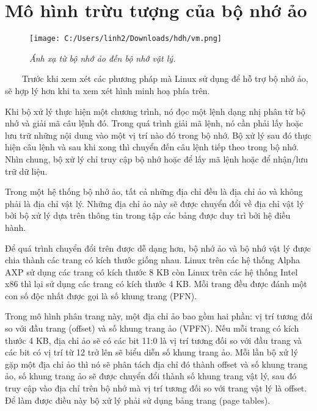 \documentclass{article}
\begin{document}
\section{Mô hình trừu tượng của bộ nhớ ảo}

\begin{figure}[H]
  \centering
  \texttt{[image: C:/Users/linh2/Downloads/hdh/vm.png]}
  \caption{\textit{Ánh xạ từ bộ nhớ ảo đến bộ nhớ vật lý.}}
  \label{fig:abstractmodel1}
\end{figure}
~~~~Trước khi xem xét các phương pháp mà Linux sử dụng để hỗ trợ bộ nhớ ảo, sẽ hợp lý hơn khi ta xem xét hình minh hoạ phía trên.\vspace{1em}

Khi bộ xử lý thực hiện một chương trình, nó đọc một lệnh dạng nhị phân từ bộ nhớ và giải mã câu lệnh đó. Trong quá trình giải mã lệnh, nó cần phải lấy hoặc lưu trữ những nội dung vào một vị trí nào đó trong bộ nhớ. Bộ xử lý sau đó thực hiện câu lệnh và sau khi xong thì chuyển đến câu lệnh tiếp theo trong bộ nhớ. Nhìn chung, bộ xử lý chỉ truy cập bộ nhớ hoặc để lấy mã lệnh hoặc để nhận/lưu trữ dữ liệu.\vspace{1em}

Trong một hệ thống bộ nhớ ảo, tất cả những địa chỉ đều là địa chỉ ảo và không phải là địa chỉ vật lý. Những địa chỉ ảo này sẽ được chuyển đổi về địa chỉ vật lý bởi bộ xử lý dựa trên thông tin trong tập các bảng được duy trì bởi hệ điều hành.\vspace{1em}

Để quá trình chuyển đổi trên được dễ dạng hơn, bộ nhớ ảo và bộ nhớ vật lý được chia thành các trang có kích thước giống nhau. Linux trên các hệ thống Alpha AXP sử dụng các trang có kích thước 8 KB còn Linux trên các hệ thống Intel x86 thì lại sử dụng các trang có kích thước 4 KB. Mỗi trang đều được đánh một con số độc nhất được gọi là số khung trang (PFN).\vspace{1em}

Trong mô hình phân trang này, một địa chỉ ảo bao gồm hai phần: vị trí tương đối so với đầu trang (offset) và số khung trang ảo (VPFN). Nếu mỗi trang có kích thước 4 KB, địa chỉ ảo sẽ có các bit 11:0 là vị trí tương đối so với đầu trang và các bit có vị trí từ 12 trở lên sẽ biểu diễn số khung trang ảo. Mỗi lần bộ xử lý gặp một địa chỉ ảo thì nó sẽ phân tách địa chỉ đó thành offset và số khung trang ảo, số khung trang ảo sẽ được chuyển đổi thành số khung trang vật lý, sau đó truy cập vào địa chỉ trên bộ nhớ mà vị trí tương đối so với trang vật lý là offset. Để làm được điều này bộ xử lý phải sử dụng bảng trang (page tables).\vspace{1em}
\end{document}
